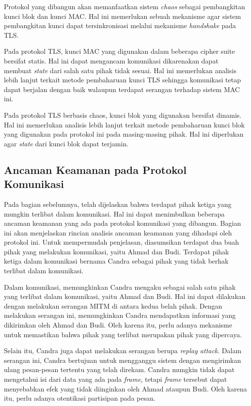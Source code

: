 Protokol yang dibangun akan memanfaatkan sistem \emph{chaos} sebagai pembangkitan kunci blok dan kunci MAC. Hal ini memerlukan sebuah mekanisme agar sistem pembangkitan kunci dapat tersinkronisasi melalui mekanisme \emph{handshake} pada TLS. 

Pada protokol TLS, kunci MAC yang digunakan dalam beberapa cipher suite bersifat statis. Hal ini dapat mengancam komunikasi dikarenakan dapat membuat \emph{state} dari salah satu pihak tidak sesuai. Hal ini memerlukan analisis lebih lanjut terkait metode pembaharuan kunci TLS sehingga komunikasi tetap dapat berjalan dengan baik walaupun terdapat serangan terhadap sistem MAC ini.

Pada protokol TLS berbasis chaos, kunci blok yang digunakan bersifat dinamis. Hal ini memerlukan analisis lebih lanjut terkait metode pembaharuan kunci blok yang digunakan pada protokol ini pada masing-masing pihak. Hal ini diperlukan agar \emph{state} dari kunci blok dapat terjamin.

\subsection{Ancaman Keamanan pada Protokol Komunikasi}

Pada bagian sebelumnya, telah dijelaskan bahwa terdapat pihak ketiga yang mungkin terlibat dalam komunikasi. Hal ini dapat menimbulkan beberapa ancaman keamanan yang ada pada protokol komunikasi yang dibangun. Bagian ini akan menjelaskan rincian analisis ancaman keamanan yang dihadapi oleh protokol ini. Untuk mempermudah penjelasan, diasumsikan terdapat dua buah pihak yang melakukan komunikasi, yaitu Ahmad dan Budi. Terdapat pihak ketiga dalam komunikasi bernama Candra sebagai pihak yang tidak berhak terlibat dalam komunikasi. 

Dalam komunikasi, memungkinkan Candra mengaku sebagai salah satu pihak yang terlibat dalam komunikasi, yaitu Ahmad dan Budi. Hal ini dapat dilakukan dengan melakukan serangan MITM di antara kedua belah pihak. Dengan melakukan serangan ini, memungkinkan Candra mendapatkan informasi yang dikirimkan oleh Ahmad dan Budi. Oleh karena itu, perlu adanya mekanisme untuk memastikan bahwa pihak yang terlibat merupakan pihak yang dipercaya.

Selain itu, Candra juga dapat melakukan serangan berupa \emph{replay attack}. Dalam serangan ini, Candra bertujuan untuk mengganggu sistem dengan mengirimkan ulang pesan-pesan tertentu yang telah direkam. Candra mungkin tidak dapat mengetahui isi dari data yang ada pada \emph{frame}, tetapi \emph{frame} tersebut dapat menyebabkan efek yang tidak diinginkan oleh Ahmad ataupun Budi. Oleh karena itu, perlu adanya otentikasi partisipan pada pesan.

